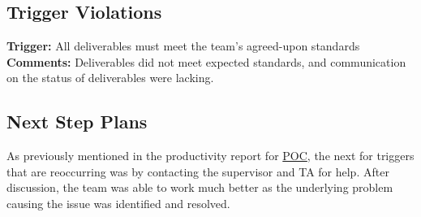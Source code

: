 \documentclass{article}
\begin{document}
\subsection{Trigger Violations}
\textbf{Trigger:} All deliverables must meet the team's agreed-upon standards \\
\textbf{Comments:} Deliverables did not meet expected standards, and communication on the status of deliverables were lacking.\\
\subsection{Next Step Plans}
As previously mentioned in the productivity report for \href{https://github.com/thaafei/DomainX/blob/main/docs/projMngmnt/POC_Team_Contrib.pdf}{POC}, the next for triggers that are reoccurring was by contacting the supervisor and TA for help.
After discussion, the team was able to work much better as the underlying problem causing the issue was identified and resolved.
\end{document}
